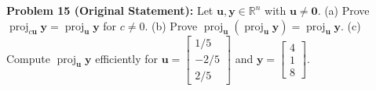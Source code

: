 \documentclass[11pt, letterpaper]{article}
\theoremstyle{definition}
\theoremstyle{remark}
\begin{document}
\medskip
\textbf{Problem 15 (Original Statement):} Let $\mathbf{u}, \mathbf{y} \in \mathbb{R}^n$ with $\mathbf{u} \neq \mathbf{0}$. (a) Prove $\operatorname{proj}_{c\mathbf{u}}\mathbf{y} = \operatorname{proj}_{\mathbf{u}}\mathbf{y}$ for $c \neq 0$. (b) Prove $\operatorname{proj}_{\mathbf{u}}(\operatorname{proj}_{\mathbf{u}}\mathbf{y}) = \operatorname{proj}_{\mathbf{u}}\mathbf{y}$. (c) Compute $\operatorname{proj}_{\mathbf{u}}\mathbf{y}$ efficiently for $\mathbf{u} = \begin{bmatrix} 1/5 \\ -2/5 \\ 2/5 \end{bmatrix}$ and $\mathbf{y} = \begin{bmatrix} 4 \\ 1 \\ 8 \end{bmatrix}$.
\end{document}
